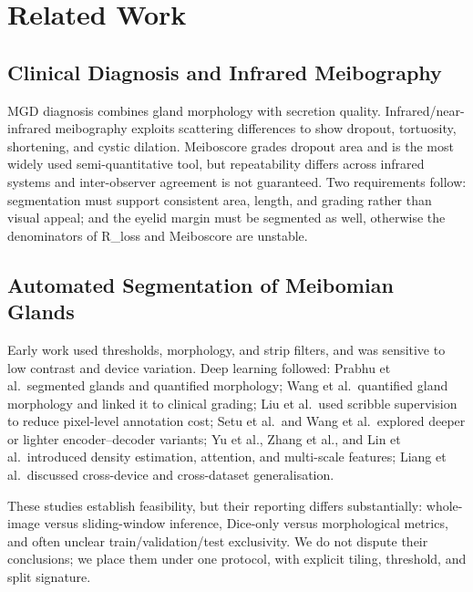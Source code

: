 \section{Related Work}\label{sec:related}

\subsection{Clinical Diagnosis and Infrared Meibography}

MGD diagnosis combines gland morphology with secretion quality\cite{foulks2003,villani2020latest}. Infrared/near-infrared meibography exploits scattering differences to show dropout, tortuosity, shortening, and cystic dilation\cite{wise2012meibography}. Meiboscore grades dropout area and is the most widely used semi-quantitative tool, but repeatability differs across infrared systems and inter-observer agreement is not guaranteed\cite{ngo2014repeat}. Two requirements follow: segmentation must support consistent area, length, and grading rather than visual appeal; and the eyelid margin must be segmented as well, otherwise the denominators of R\_loss and Meiboscore are unstable.

\subsection{Automated Segmentation of Meibomian Glands}

Early work used thresholds, morphology, and strip filters, and was sensitive to low contrast and device variation. Deep learning followed: Prabhu et al.\ segmented glands and quantified morphology\cite{prabhu2020segmentation}; Wang et al.\ quantified gland morphology and linked it to clinical grading\cite{wang2021morphology}; Liu et al.\ used scribble supervision to reduce pixel-level annotation cost\cite{liu2022scribble}; Setu et al.\ and Wang et al.\ explored deeper or lighter encoder--decoder variants\cite{setu2021deep,wang2019deep}; Yu et al., Zhang et al., and Lin et al.\ introduced density estimation, attention, and multi-scale features\cite{yu2022automatic,zhang2022density,lin2021automatic}; Liang et al.\ discussed cross-device and cross-dataset generalisation\cite{liang2024exploring}.

These studies establish feasibility, but their reporting differs substantially: whole-image versus sliding-window inference, Dice-only versus morphological metrics, and often unclear train/validation/test exclusivity. We do not dispute their conclusions; we place them under one protocol, with explicit tiling, threshold, and split signature.

